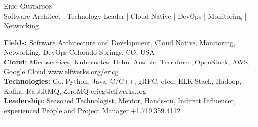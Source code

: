 \documentclass[10pt]{article}
\newcommand{\metasection}[2]
{
\footnotesize{#2} \hspace*{\fill} \footnotesize{#1}\\[1pt]
}
\begin{document}
\pagestyle{fancy}








\vspace{-8pt}
\begin{center}
	\HUGE \textsc{Eric Gustafson}
          \\[4pt]
	\small Software Architect | Technology Leader | Cloud Native | DevOps | Monitoring | Networking
\end{center}



\vspace{6pt}


\metasection{Colorado Springs, CO, USA}
            {\textbf{Fields:} Software Architecture and Development,
              Cloud Native, Monitoring, Networking, DevOps}
\metasection{www.elfwerks.org/ericg}
            {\textbf{Cloud:} Microservices, Kubernetes, Helm, Ansible, Terraform,
              OpenStack, AWS, Google Cloud}
\metasection{ericg@elfwerks.org}
            {\textbf{Technologies:} Go, Python, Java, C/C++, gRPC, etcd, ELK Stack, Hadoop, Kafka, RabbitMQ, ZeroMQ}
\metasection{+1.719.359.4112}
            {\textbf{Leadership:} Seasoned Technologist, Mentor,
              Hands-on, Indirect Influencer, experienced People and
              Project Manager}
\vspace{-2pt}
\textcolor{softcol}{\hrule}
\vspace{6pt}
\end{document}

